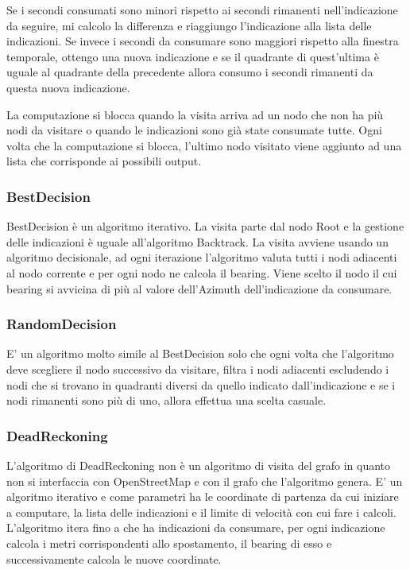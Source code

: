\documentclass[12pt,a4paper,openright,twoside]{report}
\begin{document}
Se i secondi consumati sono minori rispetto ai secondi rimanenti nell'indicazione da seguire, mi calcolo la differenza e riaggiungo l'indicazione alla lista delle indicazioni. Se invece i secondi da consumare sono maggiori rispetto alla finestra temporale, ottengo una nuova indicazione e se il quadrante di quest'ultima è uguale al quadrante della precedente allora consumo i secondi rimanenti da questa nuova indicazione.

La computazione si blocca quando la visita arriva ad un nodo che non ha più nodi da visitare o quando le indicazioni sono già state consumate tutte. Ogni volta che la computazione si blocca, l'ultimo nodo visitato viene aggiunto ad una lista che corrisponde ai possibili output.

\subsubsection{BestDecision}
BestDecision è un algoritmo iterativo. La visita parte dal nodo Root e la gestione delle indicazioni è uguale all'algoritmo Backtrack. La visita avviene usando un algoritmo decisionale, ad ogni iterazione l'algoritmo valuta tutti i nodi adiacenti al nodo corrente e  per ogni nodo ne calcola il bearing. Viene scelto il nodo il cui bearing si avvicina di più al valore dell'Azimuth dell'indicazione da consumare. 

\subsubsection{RandomDecision}
E' un algoritmo molto simile al BestDecision solo che ogni volta che l'algoritmo deve scegliere il nodo successivo da visitare, filtra i nodi adiacenti escludendo i nodi che si trovano in quadranti diversi da quello indicato dall'indicazione e se i nodi rimanenti sono più di uno, allora effettua una scelta casuale.

\subsubsection{DeadReckoning}
L'algoritmo di DeadReckoning non è un algoritmo di visita del grafo in quanto non si interfaccia con OpenStreetMap e con il grafo che l'algoritmo genera.
E' un algoritmo iterativo e come parametri ha le coordinate di partenza da cui iniziare a computare, la lista delle indicazioni e il limite di velocità con cui fare i calcoli.
L'algoritmo itera fino a che ha indicazioni da consumare, per ogni indicazione calcola i metri corrispondenti allo spostamento, il bearing di esso e successivamente calcola le nuove coordinate.
\end{document}
